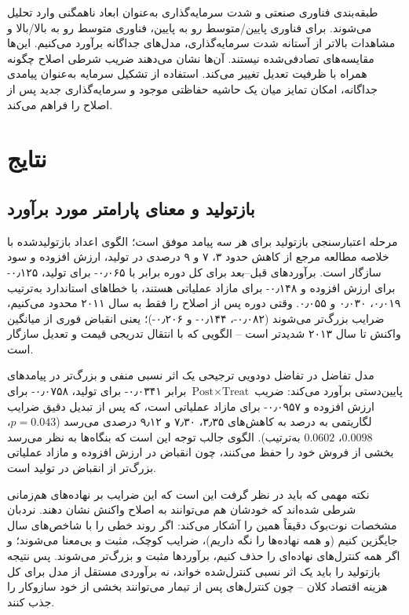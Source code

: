 \documentclass[11pt]{article}
\begin{document}
طبقه‌بندی فناوری صنعتی و شدت سرمایه‌گذاری به‌عنوان ابعاد ناهمگنی وارد تحلیل می‌شوند. برای فناوری پایین/متوسط رو به پایین، فناوری متوسط رو به بالا/بالا و مشاهدات بالاتر از آستانه شدت سرمایه‌گذاری، مدل‌های جداگانه برآورد می‌کنیم. این‌ها مقایسه‌های تصادفی‌شده نیستند. آن‌ها نشان می‌دهند ضریب شرطی اصلاح چگونه همراه با ظرفیت تعدیل تغییر می‌کند. استفاده از تشکیل سرمایه به‌عنوان پیامدی جداگانه، امکان تمایز میان یک حاشیه حفاظتی موجود و سرمایه‌گذاری جدید پس از اصلاح را فراهم می‌کند.

\section{نتایج}

\subsection{بازتولید و معنای پارامتر مورد برآورد}

مرحله اعتبارسنجی بازتولید برای هر سه پیامد موفق است؛ الگوی اعداد بازتولیدشده با خلاصه مطالعه مرجع از کاهش حدود ۳، ۷ و ۹ درصدی در تولید، ارزش افزوده و سود سازگار است. برآوردهای قبل--بعد برای کل دوره برابر با ۰٫۰۶۵- برای تولید، ۰٫۱۲۵- برای ارزش افزوده و ۰٫۱۴۸- برای مازاد عملیاتی هستند، با خطاهای استاندارد به‌ترتیب ۰٫۰۱۹، ۰٫۰۳۰ و ۰٫۰۵۵. وقتی دوره پس از اصلاح را فقط به سال ۲۰۱۱ محدود می‌کنیم، ضرایب بزرگ‌تر می‌شوند (۰٫۰۸۲-، ۰٫۱۴۴- و ۰٫۲۰۶-)؛ یعنی انقباض فوری از میانگین واکنش تا سال ۲۰۱۳ شدیدتر است -- الگویی که با انتقال تدریجی قیمت و تعدیل سازگار است.

مدل تفاضل در تفاضل دودویی ترجیحی یک اثر نسبی منفی و بزرگ‌تر در پیامدهای پایین‌دستی برآورد می‌کند: ضریب $\text{Post}\times\text{Treat}$ برابر ۰٫۰۳۴۱- برای تولید، ۰٫۰۷۵۸- برای ارزش افزوده و ۰٫۰۹۵۷- برای مازاد عملیاتی است، که پس از تبدیل دقیق ضرایب لگاریتمی به درصد به کاهش‌های ۳٫۳۵، ۷٫۳۰ و ۹٫۱۲ درصدی می‌رسد ($p=0.043$، $0.0098$، $0.0602$ به‌ترتیب). الگوی جالب توجه این است که بنگاه‌ها به نظر می‌رسد بخشی از فروش خود را حفظ می‌کنند، چون انقباض در ارزش افزوده و مازاد عملیاتی بزرگ‌تر از انقباض در تولید است.

نکته مهمی که باید در نظر گرفت این است که این ضرایب بر نهاده‌های هم‌زمانی شرطی شده‌اند که خودشان هم می‌توانند به اصلاح واکنش نشان دهند. نردبان مشخصات نوت‌بوک دقیقاً همین را آشکار می‌کند: اگر روند خطی را با شاخص‌های سال جایگزین کنیم (و همه نهاده‌ها را نگه داریم)، ضرایب کوچک، مثبت و بی‌معنا می‌شوند؛ و اگر همه کنترل‌های نهاده‌ای را حذف کنیم، برآوردها مثبت و بزرگ‌تر می‌شوند. پس نتیجه بازتولید را باید یک اثر نسبی کنترل‌شده خواند، نه برآوردی مستقل از مدل برای کل هزینه اقتصاد کلان -- چون کنترل‌های پس از تیمار می‌توانند بخشی از خود سازوکار را جذب کنند.
\end{document}
